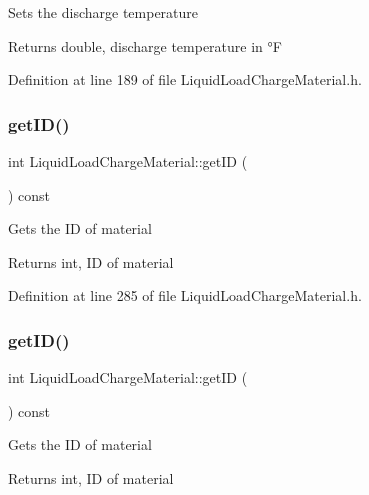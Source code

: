 Sets the discharge temperature \begin{DoxyReturn}{Returns}
double, discharge temperature in °F 
\end{DoxyReturn}


Definition at line 189 of file Liquid\+Load\+Charge\+Material.\+h.

\mbox{\label{class_liquid_load_charge_material_a92591f91c6ed9fdda10733a439e86389}} 
\subsubsection{\texorpdfstring{get\+I\+D()}{getID()}\hspace{0.1cm}{\footnotesize\ttfamily [1/3]}}
{\footnotesize\ttfamily int Liquid\+Load\+Charge\+Material\+::get\+ID (\begin{DoxyParamCaption}{ }\end{DoxyParamCaption}) const\hspace{0.3cm}{\ttfamily [inline]}}

Gets the ID of material \begin{DoxyReturn}{Returns}
int, ID of material 
\end{DoxyReturn}


Definition at line 285 of file Liquid\+Load\+Charge\+Material.\+h.

\mbox{\label{class_liquid_load_charge_material_a92591f91c6ed9fdda10733a439e86389}} 
\subsubsection{\texorpdfstring{get\+I\+D()}{getID()}\hspace{0.1cm}{\footnotesize\ttfamily [2/3]}}
{\footnotesize\ttfamily int Liquid\+Load\+Charge\+Material\+::get\+ID (\begin{DoxyParamCaption}{ }\end{DoxyParamCaption}) const\hspace{0.3cm}{\ttfamily [inline]}}

Gets the ID of material \begin{DoxyReturn}{Returns}
int, ID of material 
\end{DoxyReturn}


